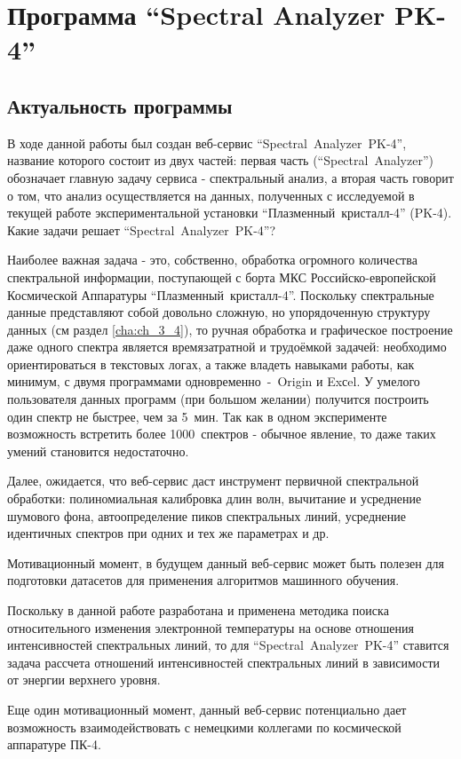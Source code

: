 \chapter{Программа “Spectral Analyzer PK-4”}
\label{cha:ch_4}
\section{Актуальность программы}
В ходе данной работы был создан веб-сервис “Spectral~Analyzer~PK-4”, название которого состоит из двух частей:
первая часть (“Spectral~Analyzer”) обозначает главную задачу сервиса - спектральный анализ, а вторая часть говорит
о том, что анализ осуществляется на данных, полученных с исследуемой в текущей работе экспериментальной установки
“Плазменный~кристалл-4” (PK-4). Какие задачи решает “Spectral~Analyzer~PK-4”?

Наиболее важная задача - это, собственно, обработка огромного количества спектральной информации, поступающей с борта МКС
Российско-европейской Космической Аппаратуры “Плазменный~кристалл-4”. Поскольку спектральные данные представляют собой
довольно сложную, но упорядоченную структуру данных (см раздел \ref{cha:ch_3_4}), то ручная обработка и
графическое построение даже одного спектра является времязатратной и трудоёмкой задачей: необходимо ориентироваться
в текстовых логах, а также владеть навыками работы, как минимум, с двумя программами одновременно~-~Origin и Exсel.
У умелого пользователя данных программ (при большом желании) получится построить один спектр не быстрее, чем за 5~мин.
Так как в одном эксперименте возможность встретить более 1000~спектров - обычное явление, то даже таких умений становится недостаточно.

Далее, ожидается, что веб-сервис даст инструмент первичной спектральной обработки: полиномиальная калибровка длин волн,
вычитание и усреднение шумового фона, автоопределение пиков спектральных линий, усреднение идентичных спектров при одних
и тех же параметрах и др.

Мотивационный момент, в будущем данный веб-сервис может быть полезен для подготовки датасетов для применения алгоритмов
машинного обучения.

Поскольку в данной работе разработана и применена методика поиска относительного изменения электронной температуры на основе
отношения интенсивностей спектральных линий, то для “Spectral~Analyzer~PK-4” ставится задача рассчета отношений интенсивностей
спектральных линий в зависимости от энергии верхнего уровня.

Еще один мотивационный момент, данный веб-сервис потенциально дает возможность взаимодействовать
с немецкими коллегами по космической аппаратуре ПК-4.

